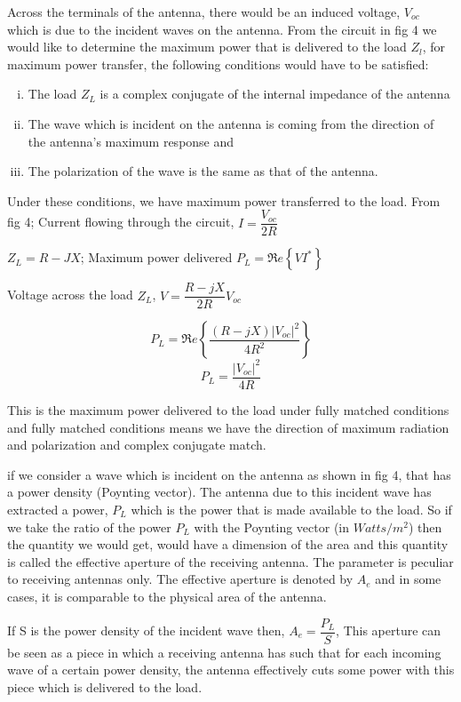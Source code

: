 Across the terminals of the antenna, there would be an induced voltage, $V_{oc}$ which is due to the incident waves on the antenna. From the circuit in fig 4 we would like to determine the maximum power that is delivered to the load $Z_{l}$, for maximum power transfer, the following conditions would have to be satisfied:
\begin{enumerate}[(i)]
\item The load $Z_{L}$ is a complex conjugate of the internal impedance of the antenna
\item The wave which is incident on the antenna is coming from the direction of the antenna's maximum response and
\item The polarization of the wave is the same as that of the antenna.
\end{enumerate}

Under these conditions, we have maximum power transferred to the load. From fig 4; Current flowing through the circuit, $I=\dfrac{V_{oc}}{2R}$ 

$Z_{L}=R-JX$; Maximum power delivered $P_{L}=\Re e\left\{VI^{*}\right\}$

Voltage across the load $Z_{L}$, $V={\dfrac{R-jX}{2R}}V_{oc}$ 

$$P_{L}=\Re e\left\{\dfrac{(R-jX)|V_{oc}|^{2}}{4R^{2}}\right\}$$
$$P_{L}=\dfrac{|V_{oc}|^{2}}{4R}$$

This is the maximum power delivered to the load under fully matched conditions and fully matched conditions means we have the direction of maximum radiation and polarization and complex conjugate match.

{if} we consider a wave which is incident on the antenna as shown in fig 4, that has a power density (Poynting vector). The antenna due to this incident wave has extracted a power, $P_{L}$ which is the power that is made available to the load. So if we take the ratio of the power $P_{L}$ with the Poynting vector (in $Watts/m^{2}$) then the quantity we would get, would have a dimension of the area and this quantity is called the effective aperture of the receiving antenna. The parameter is peculiar to receiving antennas only. The effective aperture is denoted by $A_{e}$ and in some cases, it is comparable to the physical area of the antenna.

If S is the power density of the incident wave then,
\newline $A_{e}=\dfrac{P_{L}}{S}$, This aperture can be seen as a piece in which a receiving antenna has such that for each incoming wave of a certain power density, the antenna effectively cuts some power with this piece which is delivered to the load.


